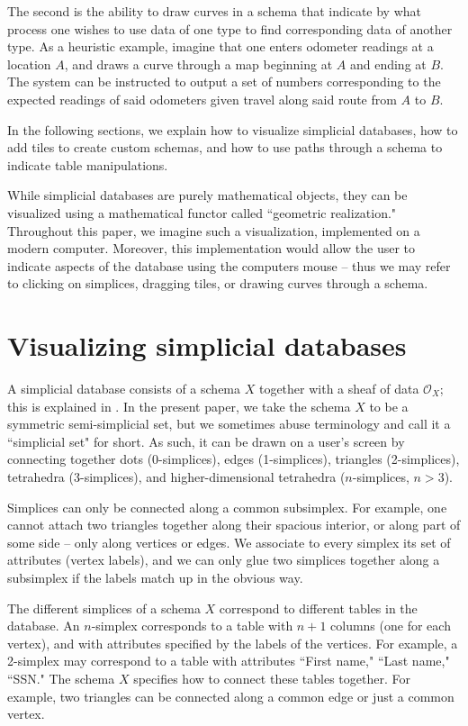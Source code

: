 \documentclass{amsart}
\def\mc{\mathcal}
\def\mcO{\mc{O}}
\theoremstyle{remark}
\theoremstyle{definition}
\begin{document}
The second is the ability to draw curves in a schema that indicate by what process one wishes to use data of one type to find corresponding data of another type.  As a heuristic example, imagine that one enters odometer readings at a location $A$, and draws a curve through a map beginning at $A$ and ending at $B$.  The system can be instructed to output a set of numbers corresponding to the expected readings of said odometers given travel along said route from $A$ to $B$.

In the following sections, we explain how to visualize simplicial databases, how to add tiles to create custom schemas, and how to use paths through a schema to indicate table manipulations.

While simplicial databases are purely mathematical objects, they can be visualized using a mathematical functor called ``geometric realization."  Throughout this paper, we imagine such a visualization, implemented on a modern computer.  Moreover, this implementation would allow the user to indicate aspects of the database using the computers mouse -- thus we may refer to clicking on simplices, dragging tiles, or drawing curves through a schema.

\section{Visualizing simplicial databases}

A simplicial database consists of a schema $X$ together with a sheaf of data $\mcO_X$; this is explained in \cite{Spi}.  In the present paper, we take the schema $X$ to be a symmetric semi-simplicial set, but we sometimes abuse terminology and call it a ``simplicial set" for short.  As such, it can be drawn on a user's screen by connecting together dots (0-simplices), edges (1-simplices), triangles (2-simplices), tetrahedra (3-simplices), and higher-dimensional tetrahedra ($n$-simplices, $n>3$).   

Simplices can only be connected along a common subsimplex.  For example, one cannot attach two triangles together along their spacious interior, or along part of some side -- only along vertices or edges. We associate to every simplex its set of attributes (vertex labels), and we can only glue two simplices together along a subsimplex if the labels match up in the obvious way.

The different simplices of a schema $X$ correspond to different tables in the database.  An $n$-simplex corresponds to a table with $n+1$ columns (one for each vertex), and with attributes specified by the labels of the vertices.  For example, a 2-simplex may correspond to a table with attributes ``First name," ``Last name," ``SSN."  The schema $X$ specifies how to connect these tables together.  For example, two triangles can be connected along a common edge or just a common vertex.
  
\end{document}
